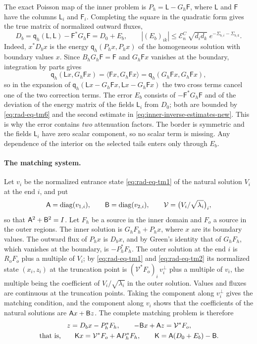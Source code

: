The exact Poisson map of the inner problem is
$P_h=\mathsf L-G_h\mathsf F$, where $\mathsf L$ and $\mathsf F$ have
the columns $\mathsf L_i$ and $\mathsf F_i$. Completing the square in
the quadratic form gives the true matrix of normalized outward fluxes,
\begin{equation}\label{eq:rad-eq-tm7}
 D_b=\mathsf q_h(\mathsf L,\mathsf L)-\mathsf F^*G_h\mathsf F
       =D_0+E_b,
 \qquad |(E_b)_{ik}|\le
     \mathcal E_n^C\,\sqrt{d_id_k}\;e^{-\Sigma_{b,i}-\Sigma_{b,k}} .
\end{equation}
Indeed, $x^*D_bx$ is the energy $\mathsf q_h(P_hx,P_hx)$ of the
homogeneous solution with boundary values $x$. Since
$B_hG_h\mathsf F=\mathsf F$ and $G_h\mathsf Fx$ vanishes at the
boundary, integration by parts gives
\[
 \mathsf q_h(\mathsf Lx,G_h\mathsf Fx)
 =\langle\mathsf Fx,G_h\mathsf Fx\rangle
 =\mathsf q_h(G_h\mathsf Fx,G_h\mathsf Fx) ,
\]
so in the expansion of $\mathsf q_h(\mathsf Lx-G_h\mathsf Fx,
\mathsf Lx-G_h\mathsf Fx)$ the two cross terms cancel one of the two
correction terms. The error $E_b$ consists of $-\mathsf F^*G_h\mathsf F$
and of the deviation of the energy matrix of the fields $\mathsf L_i$
from $D_0$; both are bounded by \eqref{eq:rad-eq-tm6} and the second
estimate in \eqref{eq:inner-inverse-estimates-new}. This is why the
error contains \emph{two} attenuation
factors. The border is symmetric and the fields $\mathsf L_i$ have
zero scalar component, so no scalar term is missing. Any dependence of
the interior on the selected tails enters only through $E_b$.

\paragraph{The matching system.}
Let $v_i$ be the normalized entrance state \eqref{eq:rad-eq-tm1} of
the natural solution $V_i$ at the end $i$, and put
\[
 \mathsf A=\operatorname{diag}(v_{1,i}),\qquad \mathsf B=\operatorname{diag}(v_{2,i}),\qquad
 \mathcal V=\bigl(V_i/\sqrt{\lambda_i}\bigr)_i ,
\]
so that $\mathsf A^2+\mathsf B^2=I$. Let $F_h$ be a source in the inner domain
and $F_o$ a source in the outer regions. The inner solution is
$G_hF_h+P_hx$, where $x$ are its boundary values. The outward flux of
$P_hx$ is $D_bx$, and by Green's identity that of $G_hF_h$, which
vanishes at the boundary, is $-P_h^*F_h$. The outer solution at the
end $i$ is $R_oF_o$ plus a multiple of $V_i$; by
\eqref{eq:rad-eq-tm1} and \eqref{eq:rad-eq-tm2} its normalized state
$(x_i,z_i)$ at the truncation point is
$(\mathcal V^*F_o)_i\,v_i^\perp$ plus a multiple of $v_i$, the
multiple being the coefficient of $V_i/\sqrt{\lambda_i}$ in the outer
solution. Values and fluxes are continuous at the truncation points.
Taking the component along $v_i^\perp$ gives the matching condition,
and the component along $v_i$ shows that the coefficients of the
natural solutions are $\mathsf A x+\mathsf B z$. The complete matching problem is
therefore
\begin{equation}\label{eq:rad-eq-tm8}
 \begin{gathered}
 z=D_bx-P_h^*F_h,\qquad -\mathsf B x+\mathsf A z=\mathcal V^*F_o,\\
 \text{that is,}\qquad
 \mathsf K x=\mathcal V^*F_o+\mathsf A P_h^*F_h,\qquad \mathsf K=\mathsf A(D_0+E_b)-\mathsf B .
 \end{gathered}
\end{equation}

